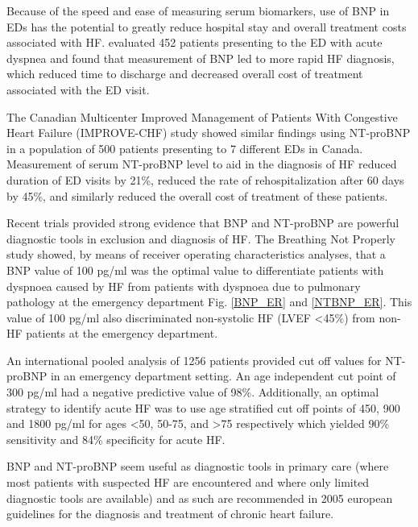 \documentclass[14pt,a4paper,onecolumn]{extarticle}
\begin{document}
Because of the speed and ease of measuring serum biomarkers, use of BNP in EDs has the potential to greatly reduce hospital stay and overall treatment costs associated with HF. \citep{Mueller2004} evaluated 452 patients presenting to the ED with acute dyspnea and found that measurement of BNP led to more rapid HF diagnosis, which reduced time to discharge and decreased overall cost of treatment associated with the ED visit.  %

The Canadian Multicenter Improved Management of Patients With Congestive Heart Failure (IMPROVE-CHF) study showed similar findings using NT-proBNP in a population of 500 patients presenting to 7 different EDs in Canada. Measurement of serum NT-proBNP level to aid in the diagnosis of HF reduced duration of ED visits by 21\%, reduced the rate of rehospitalization after 60 days by 45\%, and similarly reduced the overall cost of treatment of these patients. \citep{Moe2007} %

Recent trials provided strong evidence that BNP and NT-proBNP are powerful diagnostic tools in exclusion and diagnosis of HF. The Breathing Not Properly study showed, by means of receiver operating characteristics analyses, that a BNP value of 100 pg/ml was the optimal value to differentiate patients with dyspnoea caused by HF from patients with dyspnoea due to pulmonary pathology at the emergency department Fig. \ref{BNP_ER} and \ref{NTBNP_ER}.  This value of 100 pg/ml also discriminated non-systolic HF (LVEF <45\%) from non-HF patients at the emergency department. \citep{Maisel2002}

An international pooled analysis of 1256 patients provided cut off values for NT-proBNP in an emergency department setting. An age independent cut point of 300 pg/ml had a negative predictive value of 98\%.  Additionally, an optimal strategy to identify acute HF was to use age stratified cut off points of 450, 900 and 1800 pg/ml for ages <50, 50-75, and >75 respectively which yielded 90\% sensitivity and 84\% specificity for acute HF. \citep{Januzzi2006a}

BNP and NT-proBNP seem useful as diagnostic tools in primary care (where most patients with suspected HF are encountered and where only limited diagnostic tools are available) and as such are recommended in 2005 european guidelines for the diagnosis and treatment of chronic heart failure. \citep{Swedberg2005}
\end{document}
